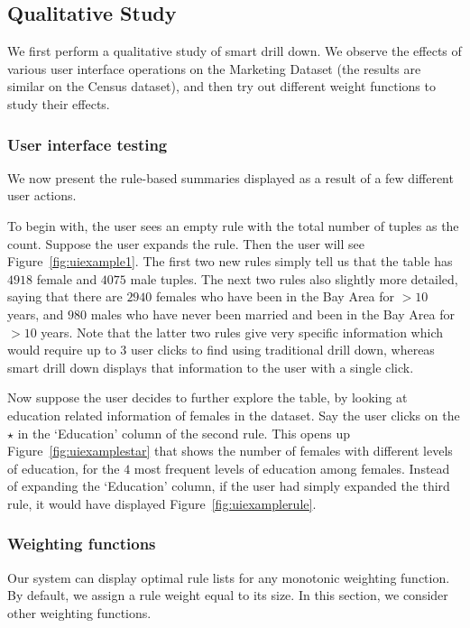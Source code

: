 \subsection{Qualitative Study}\label{sec:exp_qualitative}
We first perform a qualitative study of smart drill down. We observe the effects of various user interface operations on the Marketing Dataset (the results are similar on the Census dataset), and then try out different weight functions to study their effects.
\subsubsection{User interface testing}
We now present the rule-based summaries displayed as a result of a few different user actions.

To begin with, the user sees an empty rule with the total number of tuples as the count. Suppose the user expands the rule. Then the user will see Figure~\ref{fig:uiexample1}. The first two new rules simply tell us that the table has $4918$ female and $4075$ male tuples. The next two rules also slightly more detailed, saying that there are $2940$ females who have been in the Bay Area for $> 10$ years, and $980$ males who have never been married and been in the Bay Area for $> 10$ years. Note that the latter two rules give very specific information which would require up to $3$ user clicks to find using traditional drill down, whereas smart drill down displays that information to the user with a single click. 

Now suppose the user decides to further explore the table, by looking at education related information of females in the dataset. Say the user clicks on the $\star$ in the `Education' column of the second rule. This opens up Figure~\ref{fig:uiexamplestar} that shows the number of females with different levels of education, for the $4$ most frequent levels of education among females. Instead of expanding the `Education' column, if the user had simply expanded the third rule, it would have displayed Figure~\ref{fig:uiexamplerule}. 

\vspace{-3pt}
\subsubsection{Weighting functions}
Our system can display optimal rule lists for any monotonic weighting function. By default, we assign a rule weight equal to its size. In this section, we consider other weighting functions. 

